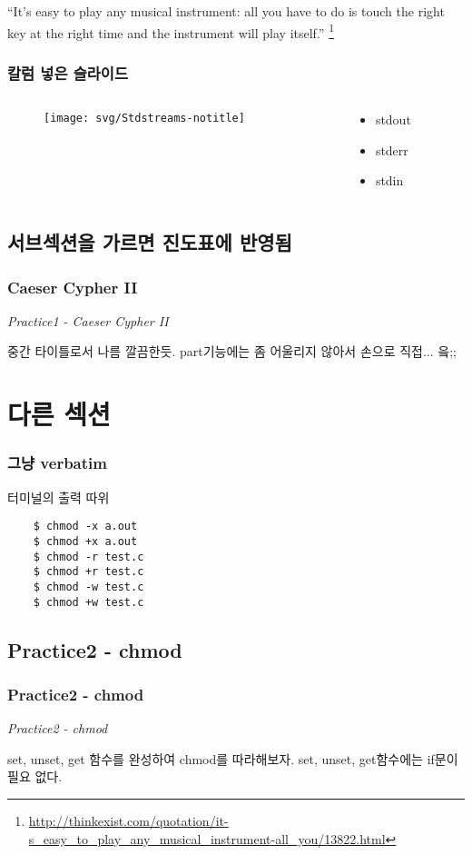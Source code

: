 \documentclass{beamer}
\begin{document}
\begin{frame}
	``It's easy to play any musical instrument: all you have to do is touch the right key at the right time and the instrument will play itself.''
	\footnote{\url{http://thinkexist.com/quotation/it-s_easy_to_play_any_musical_instrument-all_you/13822.html}}
\end{frame}

\begin{frame}
	\frametitle{칼럼 넣은 슬라이드}
	\begin{columns}
	\begin{column}{0.5\textwidth}
		\begin{figure}
		\texttt{[image: svg/Stdstreams-notitle]}
		\end{figure}
	\end{column}
	\begin{column}{0.5\textwidth}
		\begin{itemize}
			\item stdout
			\item stderr
			\item stdin
		\end{itemize}
	\end{column}
	\end{columns}
\end{frame}


\subsection{서브섹션을 가르면 진도표에 반영됨}

\begin{frame}
	\frametitle{Caeser Cypher II}
	{\em \Large Practice1 - Caeser Cypher II}

	\vspace{5mm}
	중간 타이틀로서 나름 깔끔한듯.
	part기능에는 좀 어울리지 않아서 손으로 직접... 읔;;
\end{frame}

\section{다른 섹션}

\begin{frame}[containsverbatim]
	\frametitle{그냥 verbatim}
	터미널의 출력 따위
	\begin{verbatim}
	$ chmod -x a.out
	$ chmod +x a.out
	$ chmod -r test.c
	$ chmod +r test.c
	$ chmod -w test.c
	$ chmod +w test.c
	\end{verbatim}
\end{frame}

\subsection{Practice2 - chmod}

\begin{frame}
	\frametitle{Practice2 - chmod}
	{\em \Large Practice2 - chmod}

	\vspace{5mm}
	set, unset, get 함수를 완성하여 chmod를 따라해보자.
	set, unset, get함수에는 if문이 필요 없다.
\end{frame}
\end{document}
